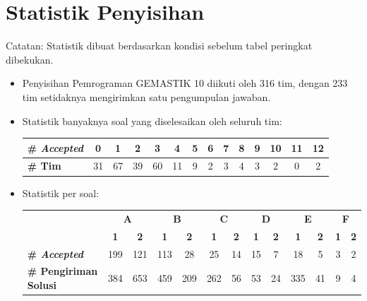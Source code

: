 \documentclass[a4paper]{article}
\begin{document}
\section*{Statistik Penyisihan}

Catatan: Statistik dibuat berdasarkan kondisi sebelum tabel peringkat dibekukan.

\begin{itemize}
\item Penyisihan Pemrograman GEMASTIK 10 diikuti oleh 316 tim, dengan 233 tim setidaknya mengirimkan satu pengumpulan jawaban.

\vspace*{.2cm}
\item Statistik banyaknya soal yang diselesaikan oleh seluruh tim:

\begin{table}[H]
\centering
\begin{tabular}{|l|c|c|c|c|c|c|c|c|c|c|c|c|c|}
\hline
\textbf{\# \textit{Accepted}} & 0  & 1  & 2  & 3  & 4  & 5 & 6 & 7 & 8 & 9 & 10 & 11 & 12 \\ \hline
\textbf{\# Tim}      & 31 & 67 & 39 & 60 & 11 & 9 & 2 & 3 & 4 & 3 & 2  & 0  & 2  \\ \hline
\end{tabular}
\end{table}

\vspace*{.2cm}
\item Statistik per soal:

\begin{table}[H]
\centering
\begin{tabular}{l|c|c|c|c|c|c|c|c|c|c|c|c|}
\cline{2-13}
                                                        & \multicolumn{2}{c|}{\textbf{A}} & \multicolumn{2}{c|}{\textbf{B}} & \multicolumn{2}{c|}{\textbf{C}} & \multicolumn{2}{c|}{\textbf{D}} & \multicolumn{2}{c|}{\textbf{E}} & \multicolumn{2}{c|}{\textbf{F}} \\ \cline{2-13} 
                                                        & \textbf{1}     & \textbf{2}     & \textbf{1}     & \textbf{2}     & \textbf{1}     & \textbf{2}     & \textbf{1}     & \textbf{2}     & \textbf{1}     & \textbf{2}     & \textbf{1}     & \textbf{2}     \\ \hline
\multicolumn{1}{|l|}{\textbf{\# \textit{Accepted}}}          & 199            & 121            & 113            & 28             & 25             & 14             & 15             & 7              & 18             & 5              & 3              & 2              \\ \hline
\multicolumn{1}{|l|}{\textbf{\# Pengiriman Solusi}} & 384            & 653            & 459            & 209            & 262            & 56             & 53             & 24             & 335            & 41             & 9              & 4              \\ \hline
\end{tabular}
\end{table}


\end{itemize}
\end{document}
